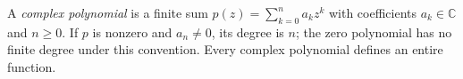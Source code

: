 
A \emph{complex polynomial} is a finite sum $p(z)=\sum_{k=0}^{n}a_kz^k$ with coefficients $a_k\in\mathbb C$ and $n\ge0$. If $p$ is nonzero and $a_n\ne0$, its degree is $n$; the zero polynomial has no finite degree under this convention. Every complex polynomial defines an entire function.
